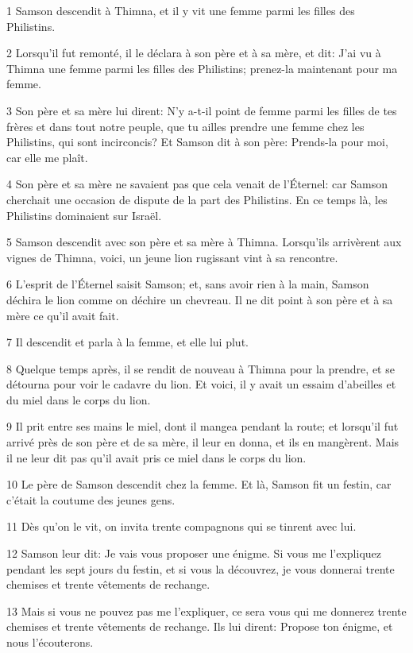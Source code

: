 \par 1 Samson descendit à Thimna, et il y vit une femme parmi les filles des Philistins.
\par 2 Lorsqu'il fut remonté, il le déclara à son père et à sa mère, et dit: J'ai vu à Thimna une femme parmi les filles des Philistins; prenez-la maintenant pour ma femme.
\par 3 Son père et sa mère lui dirent: N'y a-t-il point de femme parmi les filles de tes frères et dans tout notre peuple, que tu ailles prendre une femme chez les Philistins, qui sont incirconcis? Et Samson dit à son père: Prends-la pour moi, car elle me plaît.
\par 4 Son père et sa mère ne savaient pas que cela venait de l'Éternel: car Samson cherchait une occasion de dispute de la part des Philistins. En ce temps là, les Philistins dominaient sur Israël.
\par 5 Samson descendit avec son père et sa mère à Thimna. Lorsqu'ils arrivèrent aux vignes de Thimna, voici, un jeune lion rugissant vint à sa rencontre.
\par 6 L'esprit de l'Éternel saisit Samson; et, sans avoir rien à la main, Samson déchira le lion comme on déchire un chevreau. Il ne dit point à son père et à sa mère ce qu'il avait fait.
\par 7 Il descendit et parla à la femme, et elle lui plut.
\par 8 Quelque temps après, il se rendit de nouveau à Thimna pour la prendre, et se détourna pour voir le cadavre du lion. Et voici, il y avait un essaim d'abeilles et du miel dans le corps du lion.
\par 9 Il prit entre ses mains le miel, dont il mangea pendant la route; et lorsqu'il fut arrivé près de son père et de sa mère, il leur en donna, et ils en mangèrent. Mais il ne leur dit pas qu'il avait pris ce miel dans le corps du lion.
\par 10 Le père de Samson descendit chez la femme. Et là, Samson fit un festin, car c'était la coutume des jeunes gens.
\par 11 Dès qu'on le vit, on invita trente compagnons qui se tinrent avec lui.
\par 12 Samson leur dit: Je vais vous proposer une énigme. Si vous me l'expliquez pendant les sept jours du festin, et si vous la découvrez, je vous donnerai trente chemises et trente vêtements de rechange.
\par 13 Mais si vous ne pouvez pas me l'expliquer, ce sera vous qui me donnerez trente chemises et trente vêtements de rechange. Ils lui dirent: Propose ton énigme, et nous l'écouterons.
